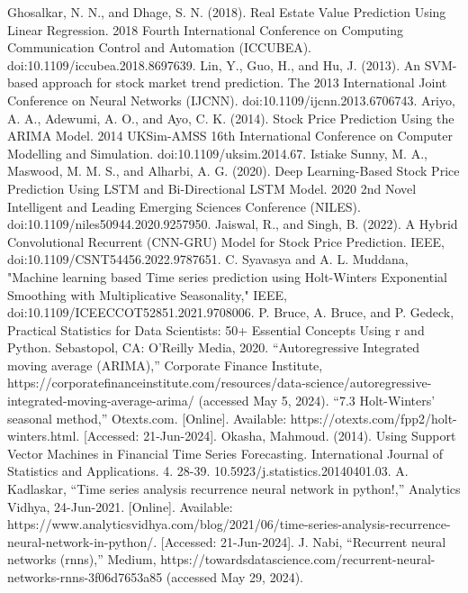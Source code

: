 \documentclass{ieeeojies}
\begin{document}
	
	\begin{thebibliography}{00}
		 Ghosalkar, N. N., and Dhage, S. N. (2018). Real Estate Value Prediction Using Linear Regression. 2018 Fourth International Conference on Computing Communication Control and Automation (ICCUBEA). doi:10.1109/iccubea.2018.8697639.
		 Lin, Y., Guo, H., and Hu, J. (2013). An SVM-based approach for stock market trend prediction. The 2013 International Joint Conference on Neural Networks (IJCNN). doi:10.1109/ijcnn.2013.6706743.
		 Ariyo, A. A., Adewumi, A. O., and Ayo, C. K. (2014). Stock Price Prediction Using the ARIMA Model. 2014 UKSim-AMSS 16th International Conference on Computer Modelling and Simulation. doi:10.1109/uksim.2014.67.
		 Istiake Sunny, M. A., Maswood, M. M. S., and Alharbi, A. G. (2020). Deep Learning-Based Stock Price Prediction Using LSTM and Bi-Directional LSTM Model. 2020 2nd Novel Intelligent and Leading Emerging Sciences Conference (NILES). doi:10.1109/niles50944.2020.9257950.
		 Jaiswal, R., and Singh, B. (2022). A Hybrid Convolutional Recurrent (CNN-GRU) Model for Stock Price Prediction. IEEE, doi:10.1109/CSNT54456.2022.9787651.
		 C. Syavasya and A. L. Muddana, "Machine learning based Time series prediction using Holt-Winters Exponential Smoothing with Multiplicative Seasonality," IEEE, doi:10.1109/ICEECCOT52851.2021.9708006.
		 P. Bruce, A. Bruce, and P. Gedeck, Practical Statistics for Data Scientists: 50+ Essential Concepts Using r and Python. Sebastopol, CA: O’Reilly Media, 2020. 
		 “Autoregressive Integrated moving average (ARIMA),” Corporate Finance Institute, https://corporatefinanceinstitute.com/resources/data-science/autoregressive-integrated-moving-average-arima/ (accessed May 5, 2024). 
		 “7.3 Holt-Winters’ seasonal method,” Otexts.com. [Online]. Available: https://otexts.com/fpp2/holt-winters.html. [Accessed: 21-Jun-2024].
		 Okasha, Mahmoud. (2014). Using Support Vector Machines in Financial Time Series Forecasting. International Journal of Statistics and Applications. 4. 28-39. 10.5923/j.statistics.20140401.03. 
		 A. Kadlaskar, “Time series analysis recurrence neural network in python!,” Analytics Vidhya, 24-Jun-2021. [Online]. Available: https://www.analyticsvidhya.com/blog/2021/06/time-series-analysis-recurrence-neural-network-in-python/. [Accessed: 21-Jun-2024].
		 J. Nabi, “Recurrent neural networks (rnns),” Medium, https://towardsdatascience.com/recurrent-neural-networks-rnns-3f06d7653a85 (accessed May 29, 2024). 

\end{thebibliography}
\end{document}
